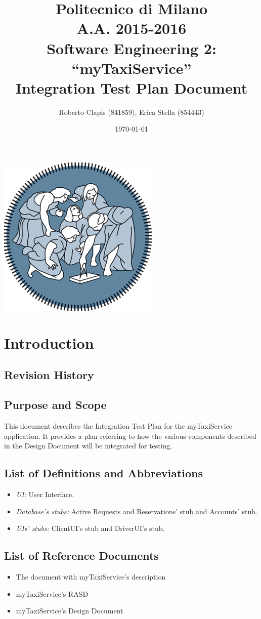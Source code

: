 \documentclass{article}
\author{Roberto Clapis (841859), Erica Stella (854443)}
\date{\today}
\title{Politecnico di Milano
	\\A.A. 2015\@-\@2016
	\\Software Engineering 2: ``myTaxiService''
	\\\textbf{I}ntegration \textbf{T}est \textbf{P}lan \textbf{D}ocument}
\begin{document}
\maketitle
\begin{center}
	\includegraphics{polimi-logo}
\end{center}
\clearpage
\tableofcontents
\clearpage
\section{Introduction}
\subsection{Revision History}
\subsection{Purpose and Scope}
This document describes the Integration Test Plan for the myTaxiService application. It provides a plan referring to how the various components 
described in the Design Document will be integrated for testing. 
\subsection{List of Definitions and Abbreviations}
\begin{itemize}
	\item \textit{UI:} User Interface.
	\item \textit{Database's stubs:} Active Requests and Reservations' stub 
	and Accounts' stub.
	\item \textit{UIs' stubs:} ClientUI's stub and DriverUI's stub.
\end{itemize}
\subsection{List of Reference Documents}
\begin{itemize}
	\item The document with myTaxiService's description
	\item myTaxiService's RASD
	\item myTaxiService's Design Document
\end{itemize}
\end{document}
